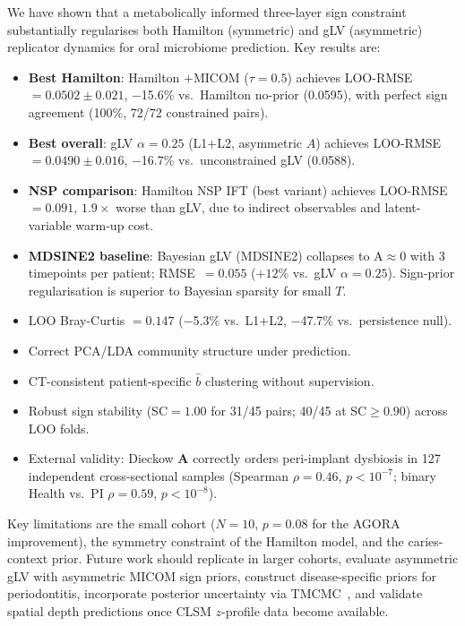 \documentclass[11pt,a4paper]{article}
\newcommand{\bA}{\mathbf{A}}
\begin{document}
We have shown that a metabolically informed three-layer sign constraint substantially
regularises both Hamilton (symmetric) and gLV (asymmetric) replicator dynamics
for oral microbiome prediction. Key results are:
\begin{itemize}[noitemsep]
  \item \textbf{Best Hamilton}: Hamilton $+$MICOM ($\tau{=}0.5$) achieves
        LOO-RMSE~$=0.0502\pm0.021$, $-$15.6\% vs.\ Hamilton no-prior (0.0595),
        with perfect sign agreement (100\%, 72/72 constrained pairs).
  \item \textbf{Best overall}: gLV $\alpha{=}0.25$ (L1+L2, asymmetric $A$) achieves
        LOO-RMSE~$=0.0490\pm0.016$, $-$16.7\% vs.\ unconstrained gLV (0.0588).
  \item \textbf{NSP comparison}: Hamilton NSP IFT (best variant) achieves
        LOO-RMSE~$=0.091$, $1.9\times$ worse than gLV, due to indirect observables
        and latent-variable warm-up cost.
  \item \textbf{MDSINE2 baseline}: Bayesian gLV (MDSINE2) collapses to A$\approx 0$
        with 3 timepoints per patient; RMSE~$=0.055$ ($+12\%$ vs.\ gLV $\alpha{=}0.25$).
        Sign-prior regularisation is superior to Bayesian sparsity for small $T$.
  \item LOO Bray-Curtis $=0.147$ ($-$5.3\% vs.\ L1+L2, $-$47.7\% vs.\ persistence null).
  \item Correct PCA/LDA community structure under prediction.
  \item CT-consistent patient-specific $\hat{b}$ clustering without supervision.
  \item Robust sign stability (SC$=1.00$ for 31/45 pairs; 40/45 at SC$\geq 0.90$) across LOO folds.
  \item External validity: Dieckow $\bA$ correctly orders peri-implant dysbiosis
        in 127 independent cross-sectional samples (Spearman $\rho=0.46$, $p<10^{-7}$;
        binary Health vs.\ PI $\rho=0.59$, $p<10^{-8}$).
\end{itemize}
Key limitations are the small cohort ($N=10$, $p=0.08$ for the AGORA improvement),
the symmetry constraint of the Hamilton model, and the caries-context prior.
Future work should replicate in larger cohorts, evaluate asymmetric gLV with
asymmetric MICOM sign priors, construct disease-specific priors for periodontitis,
incorporate posterior uncertainty via TMCMC~\citep{nishioka_paper}, and validate
spatial depth predictions once CLSM $z$-profile data become available.
\end{document}
